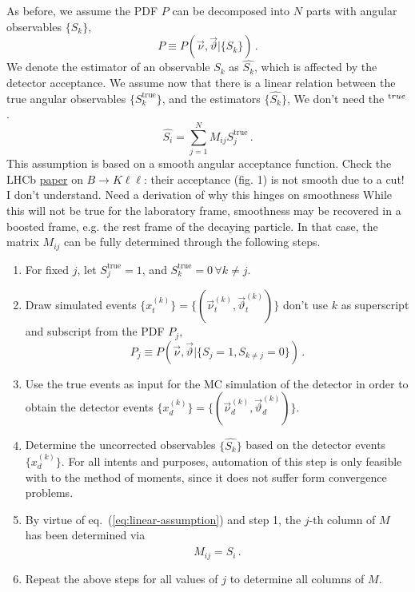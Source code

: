 \documentclass[aps,prd,reprint,nofootinbib,preprintnumbers]{revtex4}
\newcommand{\est}[1]{\widehat{#1}}
\newcommand{\refeq}[1]{eq.~(\ref{eq:#1})}
\renewcommand{\theta}{\vartheta}
\newcommand{\fred}[1]{{\color{brown!85!black}#1}}
\begin{document}
As before, we assume the PDF $P$ can be decomposed into $N$ parts with angular observables $\lbrace S_k\rbrace$,
\begin{equation}
    P \equiv P(\vec\nu,\vec\theta | \lbrace S_k \rbrace)\,.
\end{equation}
We denote the estimator of an
observable $S_k$ as $\est{S_k}$, which is affected by the detector acceptance. We assume now that there is a linear relation
between the true angular observables $\lbrace S_k^\text{true}\rbrace$, and the estimators $\lbrace \est{S_k}\rbrace$, \fred{We don't need the $^{\text true}$.}
\begin{equation}
    \label{eq:linear-assumption}
    \est{S_i} = \sum_{j = 1}^N M_{i j} S_j^\text{true}\,.
\end{equation}
This assumption is based on a smooth angular acceptance
function. \fred{Check the LHCb \href{http://inspirehep.net/record/1287929}{paper} on $B \to K \ell \ell$: their
  acceptance (fig. 1) is not smooth due to a cut!} \fred{I don't understand. Need a derivation of why this hinges on smoothness} While this will not be true for
the laboratory frame, smoothness may be recovered in a boosted frame,
e.g. the rest frame of the decaying particle.  In that case, the
matrix $M_{ij}$ can be fully determined through the following steps.
\begin{enumerate}
    \item For fixed $j$, let $S_j^\text{true} = 1$, and $S_k^\text{true} = 0\,\forall k\neq j$.
    \item Draw simulated events $\lbrace x_t^{(k)}\rbrace =
      \lbrace(\vec{\nu}^{(k)}_t,\vec\theta^{(k)}_t)\rbrace$ \fred{don't use $k$ as superscript and subscript} from the PDF $P_j$,
      \begin{equation}
        \label{eq:single-comp}
            P_j \equiv P(\vec\nu,\vec\theta | \lbrace S_j = 1, S_{k\neq j} = 0\rbrace)\,.
        \end{equation}
    \item Use the true events as input for the MC simulation of the detector in order to obtain the detector
        events $\lbrace x^{(k)}_d\rbrace = \lbrace(\vec{\nu}^{(k)}_d,\vec\theta^{(k)}_d)\rbrace$.
    \item Determine the uncorrected observables $\lbrace \est{S_k} \rbrace$ based on the detector
        events $\lbrace x^{(k)}_d\rbrace$. For all intents and purposes, automation of this step is only feasible
        with to the method of moments, since it does not suffer form convergence problems.
    \item By virtue of \refeq{linear-assumption} and step 1, the $j$-th column of $M$ has been determined via
        \begin{equation}
            M_{ij} = \est{S_i}\,.
        \end{equation}
    \item Repeat the above steps for all values of $j$ to determine all columns of $M$.
\end{enumerate}
\end{document}
